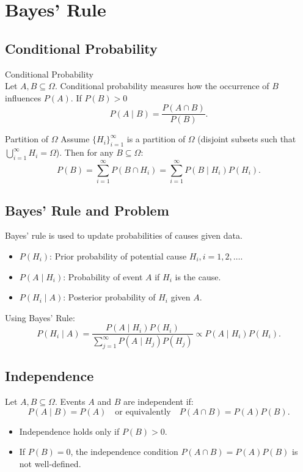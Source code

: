 \newpage
\section{Bayes' Rule}
\subsection{Conditional Probability}

\begin{df}{Conditional Probability}\\
Let \(A, B \subseteq \Omega\). Conditional probability measures how the occurrence of \(B\) influences \(P(A)\). If \(P(B) > 0\)
\[
P(A \mid B) = \frac{P(A \cap B)}{P(B)}.
\]
\end{df}

\begin{prop}{Partition of \(\Omega\)}
Assume \(\{H_i\}_{i=1}^\infty\) is a partition of \(\Omega\) (disjoint subsets such that \(\bigcup_{i=1}^\infty H_i = \Omega\)). Then for any \(B \subseteq \Omega\):
\[
P(B) = \sum_{i=1}^\infty P(B \cap H_i) = \sum_{i=1}^\infty P(B \mid H_i) P(H_i).
\]
\end{prop}

\subsection{Bayes' Rule and Problem}
Bayes' rule is used to update probabilities of causes given data.
\begin{itemize}
    \item \(P(H_i)\): Prior probability of potential cause \(H_i, i=1, 2, \dots\).
    \item \(P(A \mid H_i)\): Probability of event \(A\) if \(H_i\) is the cause.
    \item \(P(H_i \mid A)\): Posterior probability of \(H_i\) given \(A\).
\end{itemize}
Using Bayes' Rule:
\[
P(H_i \mid A) = \frac{P(A \mid H_i) P(H_i)}{\sum_{j=1}^\infty P(A \mid H_j) P(H_j)} \propto P(A \mid H_i) P(H_i).
\]

\subsection{Independence}
Let \(A, B \subseteq \Omega\). Events \(A\) and \(B\) are independent if:
\[
P(A \mid B) = P(A) \quad \text{or equivalently} \quad P(A \cap B) = P(A) P(B).
\]
\begin{itemize}
    \item Independence holds only if \(P(B) > 0\).
    \item If \(P(B) = 0\), the independence condition \(P(A \cap B) = P(A) P(B)\) is not well-defined.
\end{itemize}

